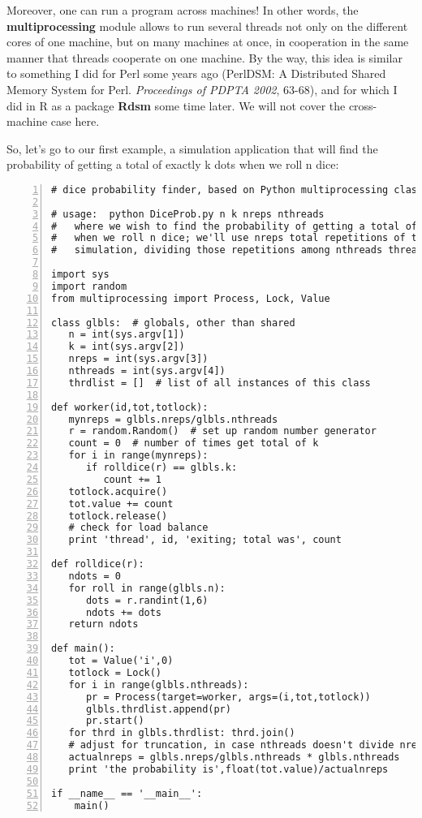 Moreover, one can run a program across machines!  In other words, the
{\bf multiprocessing} module allows to run several threads not only on
the different cores of one machine, but on many machines at once, in
cooperation in the same manner that threads cooperate on one machine.
By the way, this idea is similar to something I did for Perl some years
ago (PerlDSM: A Distributed Shared Memory System for Perl. {\it
Proceedings of PDPTA 2002}, 63-68), and for which I did in R as a
package {\bf Rdsm} some time later.  We will not cover the cross-machine
case here.

So, let's go to our first example, a simulation application that will
find the probability of getting a total of exactly k dots when we roll n
dice:

\begin{Verbatim}[fontsize=\relsize{-2},numbers=left]
# dice probability finder, based on Python multiprocessing class

# usage:  python DiceProb.py n k nreps nthreads 
#   where we wish to find the probability of getting a total of k dots
#   when we roll n dice; we'll use nreps total repetitions of the
#   simulation, dividing those repetitions among nthreads threads

import sys
import random
from multiprocessing import Process, Lock, Value

class glbls:  # globals, other than shared
   n = int(sys.argv[1])
   k = int(sys.argv[2])
   nreps = int(sys.argv[3])
   nthreads = int(sys.argv[4])
   thrdlist = []  # list of all instances of this class

def worker(id,tot,totlock):
   mynreps = glbls.nreps/glbls.nthreads
   r = random.Random()  # set up random number generator
   count = 0  # number of times get total of k
   for i in range(mynreps):
      if rolldice(r) == glbls.k:
         count += 1
   totlock.acquire()
   tot.value += count  
   totlock.release()
   # check for load balance
   print 'thread', id, 'exiting; total was', count

def rolldice(r):
   ndots = 0
   for roll in range(glbls.n):
      dots = r.randint(1,6)
      ndots += dots
   return ndots

def main():
   tot = Value('i',0)
   totlock = Lock()
   for i in range(glbls.nthreads):
      pr = Process(target=worker, args=(i,tot,totlock))
      glbls.thrdlist.append(pr)
      pr.start()
   for thrd in glbls.thrdlist: thrd.join()
   # adjust for truncation, in case nthreads doesn't divide nreps evenly
   actualnreps = glbls.nreps/glbls.nthreads * glbls.nthreads
   print 'the probability is',float(tot.value)/actualnreps

if __name__ == '__main__':
    main()
\end{Verbatim}

